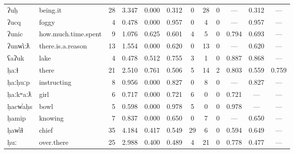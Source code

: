 \begin{landscape}
\begin{longtable}[c]{ l l | r r c c | c c c | c c c }
  ʔuḥ                & being.it                  & 28  & 3.347                     & 0.000           & 0.312      & 0         & 28          & 0            & —         & 0.312       & —\\
  ʔucq               & foggy                     & 4   & 0.478                     & 0.000           & 0.957      & 0         & 4           & 0            & —         & 0.957       & —\\
  ʔunic              & how.much.time.spent       & 9   & 1.076                     & 0.625           & 0.601      & 4         & 5           & 0            & 0.794     & 0.693       & —\\
  ʔunw̓iːƛ            & there.is.a.reason         & 13  & 1.554                     & 0.000           & 0.620      & 0         & 13          & 0            & —         & 0.620       & —\\
  ʕaʔuk              & lake                      & 4   & 0.478                     & 0.512           & 0.755      & 3         & 1           & 0            & 0.887     & 0.868       & —\\
  ḥaːɬ               & there                     & 21  & 2.510                     & 0.761           & 0.506      & 5         & 14          & 2            & 0.803     & 0.559       & 0.759\\
  ḥaːḥuːp            & instructing               & 8   & 0.956                     & 0.000           & 0.827      & 0         & 8           & 0            & —         & 0.827       & —\\
  ḥaːkʷaːƛ           & girl                      & 6   & 0.717                     & 0.000           & 0.721      & 6         & 0           & 0            & 0.721     & —           & —\\
  ḥacw̓aḥs            & bowl                      & 5   & 0.598                     & 0.000           & 0.978      & 5         & 0           & 0            & 0.978     & —           & —\\
  ḥamip              & knowing                   & 7   & 0.837                     & 0.000           & 0.650      & 0         & 7           & 0            & —         & 0.650       & —\\
  ḥaw̓iɬ              & chief                     & 35  & 4.184                     & 0.417           & 0.549      & 29        & 6           & 0            & 0.594     & 0.649       & —\\
  ḥuː                & over.there                & 25  & 2.988                     & 0.400           & 0.489      & 4         & 21          & 0            & 0.778     & 0.477       & —\\

\end{longtable}
\end{landscape}
